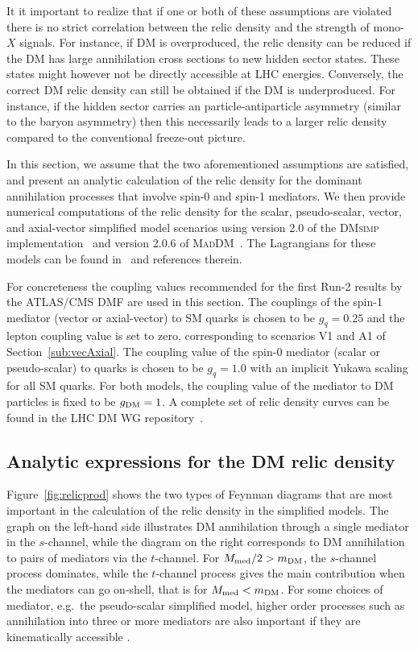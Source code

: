\documentclass[review]{elsarticle}
\newcommand{\dmsimp}{\textsc{DMsimp}\xspace}
\newcommand{\maddm}{\textsc{MadDM}\xspace}
\begin{document}
It it important to realize that if one or both of these assumptions are violated there is no strict correlation between the relic density and the strength of mono-$X$ signals. For instance, if DM is overproduced, the relic density can be reduced if the DM has large annihilation cross sections to new hidden sector states. These states might however not be directly accessible at LHC energies.  Conversely, the correct DM relic density can still be obtained  if the DM is underproduced. For instance, if the hidden sector carries an particle-antiparticle asymmetry (similar to the baryon asymmetry) then this necessarily leads to a larger relic density compared to the conventional freeze-out picture. 

In this section, we assume that the two aforementioned assumptions are satisfied, and  present an analytic calculation of the relic density for the dominant annihilation processes that involve spin-0 and spin-1 mediators. We then provide numerical computations of the relic density for the  scalar, pseudo-scalar, vector, and axial-vector simplified model scenarios using version 2.0 of the \dmsimp implementation~\cite{DMsimp}
and version 2.0.6 of \maddm~\cite{Backovic:2013dpa,Backovic:2015tpt}. The Lagrangians for these models can be found in~\cite{Boveia:2016mrp} and references therein. 

For concreteness  the coupling values recommended for the first Run-2 results by the ATLAS/CMS DMF are used in this section. The couplings of the spin-1 mediator (vector or axial-vector) to SM quarks is chosen to be $g_q = 0.25$ and the lepton coupling value is set to zero, corresponding to scenarios V1 and A1 of Section~\ref{sub:vecAxial}. The coupling value of the spin-0 mediator (scalar or pseudo-scalar) to quarks is chosen to be $g_q=1.0$ with an implicit Yukawa scaling for all SM quarks. For both models, the coupling value of the mediator to DM particles is fixed to be $g_{\rm DM}=1$.
A complete set of relic density curves can be found in the LHC DM WG repository~\cite{RelicRepo}.

\subsection{Analytic expressions for the DM relic density}
\label{analyticrelic}

Figure~\ref{fig:relicprod} shows the two  
types of Feynman diagrams that are 
most important in the calculation of the relic density in the simplified models. The graph on the left-hand side illustrates DM annihilation through a single mediator in the $s$-channel, while the diagram on the right corresponds to DM annihilation to pairs of mediators via the $t$-channel.
For $M_{\rm med}/2 > m_{\rm DM}$, the $s$-channel process dominates, while the $t$-channel process gives the main contribution when the mediators can go on-shell, that is for $M_{\rm med} < m_{\rm DM}$. For some choices of mediator, e.g.~the pseudo-scalar simplified model, higher
order processes such as annihilation into three or
more mediators are also important if they are kinematically accessible \cite{Abdullah:2014lla}.
\end{document}
